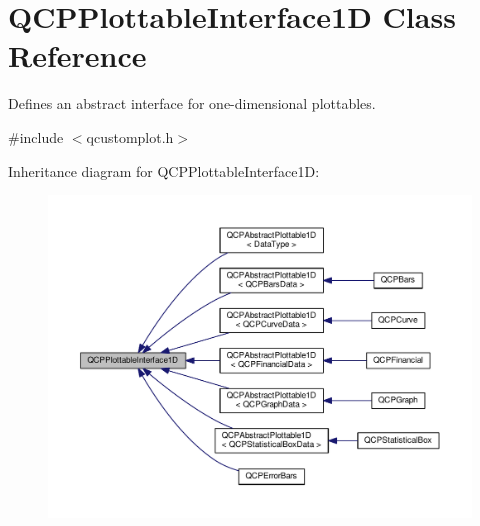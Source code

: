 \hypertarget{classQCPPlottableInterface1D}{}\section{Q\+C\+P\+Plottable\+Interface1D Class Reference}
\label{classQCPPlottableInterface1D}


Defines an abstract interface for one-\/dimensional plottables.  




{\ttfamily \#include $<$qcustomplot.\+h$>$}



Inheritance diagram for Q\+C\+P\+Plottable\+Interface1D\+:
\nopagebreak
\begin{figure}[H]
\begin{center}
\leavevmode
\includegraphics[width=350pt]{classQCPPlottableInterface1D__inherit__graph}
\end{center}
\end{figure}
